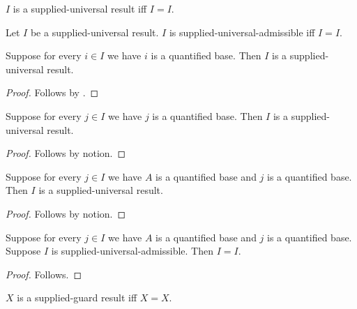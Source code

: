

\begin{definition}\label{supplied_universal_result}
    $I$ is a supplied-universal result iff $I=I$.
\end{definition}

\begin{definition}\label{supplied_universal_admissible}
    Let $I$ be a supplied-universal result.
    $I$ is supplied-universal-admissible iff $I=I$.
\end{definition}

\begin{classification}\label{supplied_universal_classification}
    Suppose for every $i\in I$ we have $i$ is a quantified base.
    Then $I$ is a supplied-universal result.
\end{classification}
\begin{proof}
    Follows by .
\end{proof}

\begin{theorem}\label{supplied_universal_identity}
    Suppose for every $j\in I$ we have $j$ is a quantified base.
    Then $I$ is a supplied-universal result.
\end{theorem}
\begin{proof}
    Follows by notion.
\end{proof}

\begin{theorem}\label{supplied_universal_projection}
    Suppose for every $j\in I$ we have $A$ is a quantified base and $j$ is a quantified base.
    Then $I$ is a supplied-universal result.
\end{theorem}
\begin{proof}
    Follows by notion.
\end{proof}

\begin{theorem}\label{supplied_universal_formation}
    Suppose for every $j\in I$ we have $A$ is a quantified base and $j$ is a quantified base.
    Suppose $I$ is supplied-universal-admissible.
    Then $I=I$.
\end{theorem}
\begin{proof}
    Follows.
\end{proof}

\begin{definition}\label{supplied_guard_result}
    $X$ is a supplied-guard result iff $X=X$.
\end{definition}

